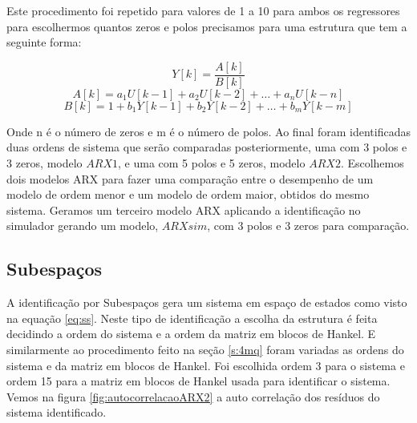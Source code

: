 Este procedimento foi repetido para valores de 1 a 10 para ambos os regressores para escolhermos quantos zeros e polos precisamos para uma estrutura que tem a seguinte forma:

\begin{equation}
Y[k]=\dfrac{A[k]}{B[k]}
\end{equation}
\begin{equation}
A[k]=a_1 U[k-1]+a_2 U[k-2]+ \dots + a_n U[k-n]
\end{equation}
\begin{equation}
B[k]=1+b_1 Y[k-1]+b_2 Y[k-2]+ \dots + b_m Y[k-m]
\end{equation}

Onde n é o número de zeros e m é o número de polos. Ao final foram identificadas duas ordens de sistema que serão comparadas posteriormente, uma com 3 polos e 3 zeros, modelo $ARX1$, e uma com 5 polos e 5 zeros, modelo $ARX2$. Escolhemos dois modelos ARX para fazer uma comparação entre o desempenho de um modelo de ordem menor e um modelo de ordem maior, obtidos do mesmo sistema. Geramos um terceiro modelo ARX aplicando a identificação no simulador gerando um modelo, $ARXsim$, com 3 polos e 3 zeros para comparação.

\subsection{Subespaços}\label{s:4subespacos}
A identificação por Subespaços gera um sistema em espaço de estados como visto na equação \eqref{eq:ss}. Neste tipo de identificação a escolha da estrutura é feita decidindo a ordem do sistema e a ordem da matriz em blocos de Hankel. E similarmente ao procedimento feito na seção \ref{s:4mq} foram variadas as ordens do sistema e da matriz em blocos de Hankel.
Foi escolhida ordem 3 para o sistema e ordem 15 para a matriz em blocos de Hankel usada para identificar o sistema. Vemos na figura \ref{fig:autocorrelacaoARX2} a auto correlação dos resíduos do sistema identificado. 




